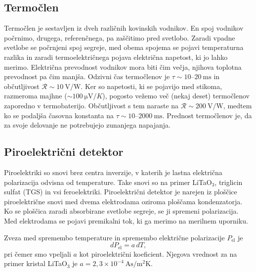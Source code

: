 \subsection*{Termočlen}
Termočlen je sestavljen iz dveh različnih kovinskih vodnikov. 
En spoj vodnikov počrnimo, drugega, 
referenčnega, pa zaščitimo pred svetlobo. Zaradi vpadne svetlobe se počrnjeni spoj 
segreje, med obema spojema se pojavi temperaturna razlika in zaradi termoelektričnega 
pojava električna napetost, ki jo lahko merimo. Električna prevodnost
vodnikov mora biti čim večja, njihova toplotna prevodnost pa čim manjša. Odzivni čas termočlenov je 
$\tau \sim 10$--$20~\si{\milli\second}$ in občutljivost $\mathcal{R} \sim 10~\si{\volt/\watt}$.
Ker so napetosti, ki se pojavijo med stikoma, razmeroma majhne 
($\sim 100~\si{\micro\volt/K}$), pogosto vežemo več (nekaj deset) termočlenov zaporedno v
termobaterijo. Občutljivost s tem naraste na $\mathcal{R} \sim 200~\si{\volt/\watt}$, medtem ko se 
podaljša časovna konstanta na $\tau \sim 10$--$2000~\si{\milli\second}$. Prednost termočlenov je,
da za svoje delovanje ne potrebujejo zunanjega napajanja. 

\subsection*{Piroelektrični detektor}
Piroelektriki so snovi brez centra inverzije, 
v katerih je lastna električna 
polarizacija odvisna od temperature. Take snovi so na primer LiTaO$_3$, 
triglicin sulfat (TGS) in vsi feroelektriki. Piroelektrični detektor je narejen iz 
ploščice piroelektrične snovi med dvema elektrodama oziroma ploščama kondenzatorja.
Ko se ploščica zaradi absorbirane svetlobe segreje, se ji spremeni polarizacija. Med 
elektrodama se pojavi premikalni tok, ki ga merimo na merilnem uporniku.

Zveza med spremembo temperature in spremembo električne polarizacije $P_\mathrm{el}$ je
\begin{equation}
dP_\mathrm{el} = a\, dT,
\end{equation}
pri čemer smo vpeljali $a$ kot piroelektrični koeficient. Njegova vrednost za na primer kristal 
LiTaO$_3$ je $a = 2,3 \times 10^{-4}~\si{\ampere \second /\metre^2 \kelvin}$.

